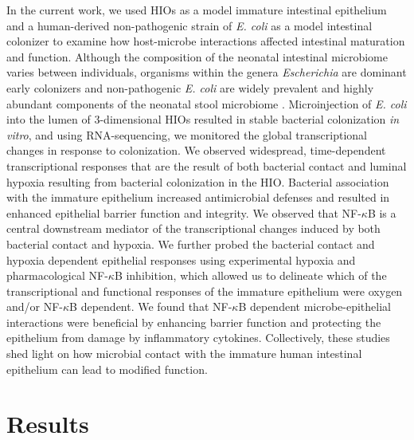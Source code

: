 \documentclass[9pt,lineo]{elife}
\begin{document}
In the current work, we used HIOs as a model immature intestinal epithelium and a human-derived non-pathogenic strain of \emph{E. coli} as a model intestinal colonizer to examine how host-microbe interactions affected intestinal maturation and function.  Although the composition of the neonatal intestinal microbiome varies between individuals, organisms within the genera \emph{Escherichia} are dominant early colonizers \citep{Gosalbes:2013,Backhed:2015} and non-pathogenic \emph{E. coli} are widely prevalent and highly abundant components of the neonatal stool microbiome \citep{Palmer:2007,Koenig:2011,Backhed:2015,Morrow:2013}. Microinjection of \emph{E. coli} into the lumen of 3-dimensional HIOs resulted in stable bacterial colonization \emph{in vitro}, and using RNA-sequencing, we monitored the global transcriptional changes in response to colonization. We observed widespread, time-dependent transcriptional responses that are the result of both bacterial contact and luminal hypoxia resulting from bacterial colonization in the HIO. Bacterial association with the immature epithelium increased antimicrobial defenses and resulted in enhanced epithelial barrier function and integrity. We observed that NF-\(\kappa\)B is a central downstream mediator of the transcriptional changes induced by both bacterial contact and hypoxia. We further probed the bacterial contact and hypoxia dependent epithelial responses using experimental hypoxia and pharmacological NF-\(\kappa\)B inhibition, which allowed us to delineate which of the transcriptional and functional responses of the immature epithelium were oxygen and/or NF-\(\kappa\)B dependent. We found that NF-\(\kappa\)B dependent microbe-epithelial interactions were beneficial by enhancing barrier function and protecting the epithelium from damage by inflammatory cytokines.  Collectively, these studies shed light on how microbial contact with the immature human intestinal epithelium can lead to modified function.

\section*{{\bfseries\sffamily } Results}
\label{sec:orgheadline12}
\end{document}
